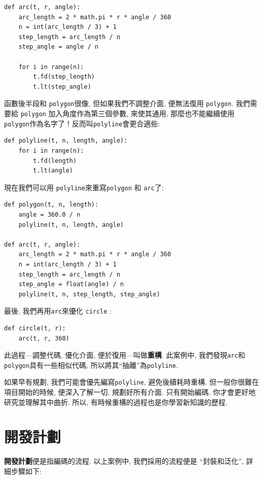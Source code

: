 \documentclass[10pt]{book}
\begin{document}
\begin{verbatim}
def arc(t, r, angle):
    arc_length = 2 * math.pi * r * angle / 360
    n = int(arc_length / 3) + 1
    step_length = arc_length / n
    step_angle = angle / n
    
    for i in range(n):
        t.fd(step_length)
        t.lt(step_angle)
\end{verbatim}
%
函數後半段和 {\tt polygon}很像, 但如果我們不調整介面, 便無法復用 {\tt polygon}. 
我們需要給 {\tt polygon} 加入角度作為第三個參數, 來使其通用, 
那麼也不能繼續使用 {\tt polygon}作為名字了！反而叫{\tt polyline}會更合適些:

\begin{verbatim}
def polyline(t, n, length, angle):
    for i in range(n):
        t.fd(length)
        t.lt(angle)
\end{verbatim}
%
現在我們可以用 {\tt polyline}來重寫{\tt polygon} 和 {\tt arc}了:

\begin{verbatim}
def polygon(t, n, length):
    angle = 360.0 / n
    polyline(t, n, length, angle)

def arc(t, r, angle):
    arc_length = 2 * math.pi * r * angle / 360
    n = int(arc_length / 3) + 1
    step_length = arc_length / n
    step_angle = float(angle) / n
    polyline(t, n, step_length, step_angle)
\end{verbatim}
%
最後, 我們再用{\tt arc}來優化 {\tt circle} :

\begin{verbatim}
def circle(t, r):
    arc(t, r, 360)
\end{verbatim}
%
此過程---調整代碼, 優化介面, 便於復用---叫做{\bf 重構}. 
此案例中, 我們發現{\tt arc}和{\tt polygon}具有一些相似代碼, 
所以將其``抽離''為{\tt polyline}.\

如果早有規劃, 我們可能會優先編寫{\tt polyline}, 避免後續耗時重構. 
但一般你很難在項目開始的時候, 便深入了解一切, 規劃好所有介面. 
只有開始編碼, 你才會更好地研究並理解其中曲折. 
所以, 有時候重構的過程也是你學習新知識的歷程. 


\section{開發計劃}

{\bf 開發計劃}便是指編碼的流程. 以上案例中, 我們採用的流程便是
``封裝和泛化'', 詳細步驟如下:
\end{document}
